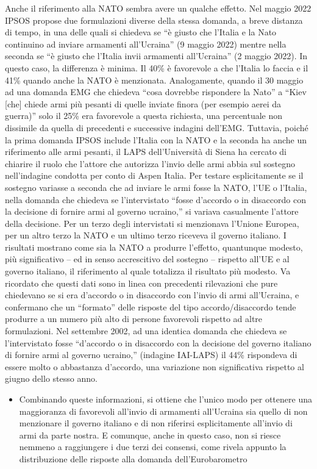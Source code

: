 \documentclass[
]{book}
\providecommand{\tightlist}{%
  \setlength{\itemsep}{0pt}\setlength{\parskip}{0pt}}
\begin{document}
Anche il riferimento alla NATO sembra avere un qualche effetto. Nel maggio 2022 IPSOS propose due formulazioni diverse della stessa domanda, a breve distanza di tempo, in una delle quali si chiedeva se ``è giusto che l'Italia e la Nato continuino ad inviare armamenti all'Ucraina'' (9 maggio 2022) mentre nella seconda se ``è giusto che l'Italia invii armamenti all'Ucraina'' (2 maggio 2022). In questo caso, la differenza è minima. Il 40\% è favorevole a che l'Italia lo faccia e il 41\% quando anche la NATO è menzionata. Analogamente, quando il 30 maggio ad una domanda EMG che chiedeva ``cosa dovrebbe rispondere la Nato'' a ``Kiev {[}che{]} chiede armi più pesanti di quelle inviate finora (per esempio aerei da guerra)'' solo il 25\% era favorevole a questa richiesta, una percentuale non dissimile da quella di precedenti e successive indagini dell'EMG. Tuttavia, poiché la prima domanda IPSOS include l'Italia con la NATO e la seconda ha anche un riferimento alle armi pesanti, il LAPS dell'Università di Siena ha cercato di chiarire il ruolo che l'attore che autorizza l'invio delle armi abbia sul sostegno nell'indagine condotta per conto di Aspen Italia. Per testare esplicitamente se il sostegno variasse a seconda che ad inviare le armi fosse la NATO, l'UE o l'Italia, nella domanda che chiedeva se l'intervistato ``fosse d'accordo o in disaccordo con la decisione di fornire armi al governo ucraino,'' si variava casualmente l'attore della decisione. Per un terzo degli intervistati si menzionava l'Unione Europea, per un altro terzo la NATO e un ultimo terzo riceveva il governo italiano. I risultati mostrano come sia la NATO a produrre l'effetto, quantunque modesto, più significativo -- ed in senso accrescitivo del sostegno -- rispetto all'UE e al governo italiano, il riferimento al quale totalizza il risultato più modesto. Va ricordato che questi dati sono in linea con precedenti rilevazioni che pure chiedevano se si era d'accordo o in disaccordo con l'invio di armi all'Ucraina, e confermano che un ``formato'' delle risposte del tipo accordo/disaccordo tende produrre a un numero più alto di persone favorevoli rispetto ad altre formulazioni. Nel settembre 2002, ad una identica domanda che chiedeva se l'intervistato fosse ``d'accordo o in disaccordo con la decisione del governo italiano di fornire armi al governo ucraino,'' (indagine IAI-LAPS) il 44\% rispondeva di essere molto o abbastanza d'accordo, una variazione non significativa rispetto al giugno dello stesso anno.

\begin{itemize}
\tightlist
\item
  Combinando queste informazioni, si ottiene che l'unico modo per ottenere una maggioranza di favorevoli all'invio di armamenti all'Ucraina sia quello di non menzionare il governo italiano e di non riferirsi esplicitamente all'invio di armi da parte nostra. E comunque, anche in questo caso, non si riesce nemmeno a raggiungere i due terzi dei consensi, come rivela appunto la distribuzione delle risposte alla domanda dell'Eurobarometro
\end{itemize}
\end{document}
